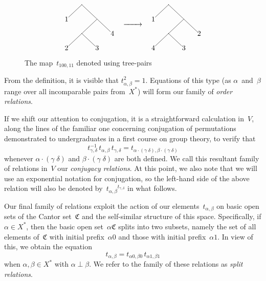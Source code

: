 \documentclass[a4paper,11pt]{article}
\numberwithin{equation}{section}
\newcommand{\C}{\mathfrak{C}}
\newcommand{\swap}[2]{(#1\;#2)}
\begin{document}
\begin{figure}
  \[
  \begin{tikzpicture}[
      inner sep=0pt,
      baseline=-30pt,
      level distance=20pt
    ]
    \node (root) [circle,fill] {}
    child {node (0) {$1$}}
    child {node (1) [circle,fill] {}
      child {node (10) [circle,fill] {}
        child {node (100) {$2$}}
        child {node (101) {$3$}}}
      child {node (11) {$4$}}};
  \end{tikzpicture}
  \quad
  \xrightarrow{\qquad}%
  \quad
  \begin{tikzpicture}[
      inner sep=0pt,
      baseline=-30pt,
      level distance=20pt
    ]
    \node (root) [circle,fill] {}
    child {node (0) {$1$}}
    child {node (1) [circle,fill] {}
      child {node (10) [circle,fill] {}
        child {node (100) {$4$}}
        child {node (101) {$3$}}}
      child {node (11) {$2$}}};
  \end{tikzpicture}
  \]
  \caption{The map~$t_{100,11}$ denoted using tree-pairs}
  \label{fig:t-example}
\end{figure}

From the definition, it is visible that $t_{\alpha,\beta}^{2} = 1$.
Equations of this type (as $\alpha$~and~$\beta$ range over all
incomparable pairs from~$X^{\ast}$) will form our family of
\emph{order relations}.

If we shift our attention to conjugation, it is a straightforward
calculation in~$V$, along the lines of the familiar one concerning
conjugation of permutations demonstrated to undergraduates in a first
course on group theory, to verify that
\[
t_{\gamma,\delta}^{-1} \, t_{\alpha,\beta} \, t_{\gamma,\delta} =
t_{\alpha\cdot\swap{\gamma}{\delta}, \beta\cdot\swap{\gamma}{\delta}}
\]
whenever $\alpha\cdot\swap{\gamma}{\delta}$ and
$\beta\cdot\swap{\gamma}{\delta}$ are both defined.  We call this
resultant family of relations in~$V$ our \emph{conjugacy relations}.
At this point, we also note that we will use an exponential notation
for conjugation, so the left-hand side of the above relation will also
be denoted by~${t_{\alpha,\beta}}^{t_{\gamma,\delta}}$ in what follows.

Our final family of relations exploit the action of our
elements~$t_{\alpha,\beta}$ on basic open sets of the Cantor set~$\C$
and the self-similar structure of this space.  Specifically, if
$\alpha \in X^{\ast}$, then the basic open set~$\alpha\C$ splits into
two subsets, namely the set of all elements of~$\C$ with initial
prefix~$\alpha0$ and those with initial prefix~$\alpha1$.  In view of
this, we obtain the equation
\begin{equation}
  t_{\alpha,\beta} = t_{\alpha0,\beta0} \, t_{\alpha1,\beta1}
  \label{eq:t-split}
\end{equation}
when $\alpha,\beta \in X^{\ast}$ with $\alpha \perp \beta$.  We refer
to the family of these relations as \emph{split relations}.
\end{document}
